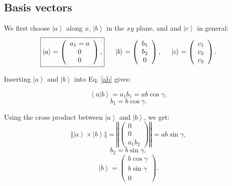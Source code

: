 \subsection*{Basis vectors}

We first choose $\left| a \right>$ along $x$, $\left| b \right>$ in the $xy$ plane, and and $\left| c \right>$ in general:
\begin{equation} 
	\boxed{ \left| a \right> = \left( \begin{array}{c} a_1 = a \\ 0 \\ 0 \end{array} \right), }
	\hspace{0.5cm} \left| b \right> = \left( \begin{array}{c} b_1 \\ b_2 \\ 0 \end{array} \right),
	\hspace{0.5cm} \left| c \right> = \left( \begin{array}{c} c_1 \\ c_2 \\ c_3 \end{array} \right).
\end{equation}


Inserting $\left| a \right>$ and $\left| b \right>$ into Eq. \ref{ab} gives:

\begin{equation} \left< a | b \right > = a_1 b_1 = ab \cos \gamma, \end{equation}
\begin{equation} b_1 = b \cos \gamma. \end{equation}


Using the cross product between $\left| a \right>$ and $\left| b \right>$, we get:
\begin{equation} 
	\left\Vert \left| a \right> \times \left| b \right> \right\Vert =
	\left\Vert \left( \begin{array}{c} 0 \\ 0 \\ a_1 b_2 \end{array} \right) \right\Vert =
	ab \sin \gamma, \label{crossab}
\end{equation}
\begin{equation} b_2 = b \sin \gamma, \end{equation}
\begin{equation} 
\boxed{ \left| b \right> = \left( \begin{array}{c} b \cos \gamma \\ b \sin \gamma \\ 0 \end{array} \right). } 
\label{bvec} 
\end{equation}


